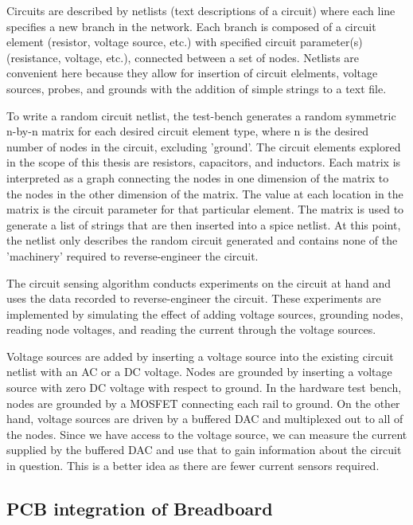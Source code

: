 \documentclass[11pt, a4paper]{article}
\begin{document}
Circuits are described by netlists (text descriptions of a circuit) where each line specifies a new branch in the network.
Each branch is composed of a circuit element (resistor, voltage source, etc.) with specified circuit parameter(s) (resistance, voltage, etc.), connected between a set of nodes.
Netlists are convenient here because they allow for insertion of circuit elelments, voltage sources, probes, and grounds with the addition of simple strings to a text file.

To write a random circuit netlist, the test-bench generates a random symmetric n-by-n matrix for each desired circuit element type, where n is the desired number of nodes in the circuit, excluding 'ground'.
The circuit elements explored in the scope of this thesis are resistors, capacitors, and inductors.
Each matrix is interpreted as a graph connecting the nodes in one dimension of the matrix to the nodes in the other dimension of the matrix.
The value at each location in the matrix is the circuit parameter for that particular element.
The matrix is used to generate a list of strings that are then inserted into a spice netlist.
At this point, the netlist only describes the random circuit generated and contains none of the 'machinery' required to reverse-engineer the circuit.

The circuit sensing algorithm conducts experiments on the circuit at hand and uses the data recorded to reverse-engineer the circuit.
These experiments are implemented by simulating the effect of adding voltage sources, grounding nodes, reading node voltages, and reading the current through the voltage sources.

Voltage sources are added by inserting a voltage source into the existing circuit netlist with an AC or a DC voltage.
Nodes are grounded by inserting a voltage source with zero DC voltage with respect to ground.
In the hardware test bench, nodes are grounded by a MOSFET connecting each rail to ground.
On the other hand, voltage sources are driven by a buffered DAC and multiplexed out to all of the nodes.
Since we have access to the voltage source, we can measure the current supplied by the buffered DAC and use that to gain information about the circuit in question.
This is a better idea as there are fewer current sensors required.


\subsection{PCB integration of Breadboard}
\end{document}
